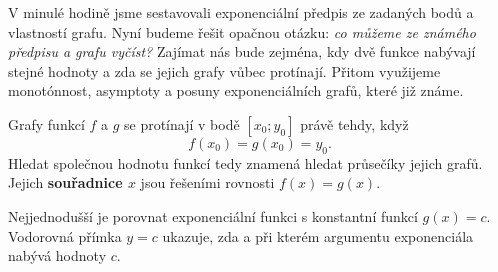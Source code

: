 \documentclass[11pt,a4paper]{article}
\begin{document}
V minulé hodině jsme sestavovali exponenciální předpis ze zadaných bodů a vlastností grafu. Nyní budeme řešit opačnou otázku: \emph{co můžeme ze známého předpisu a grafu vyčíst?} Zajímat nás bude zejména, kdy dvě funkce nabývají stejné hodnoty a zda se jejich grafy vůbec protínají. Přitom využijeme monotónnost, asymptoty a posuny exponenciálních grafů, které již známe.


\begin{zadaniBox}[title={Věta - Průsečíky grafů funkcí}]
Grafy funkcí $f$ a $g$ se protínají v bodě $[x_0;y_0]$ právě tehdy, když
\[
  f(x_0)=g(x_0)=y_0.
\]
Hledat společnou hodnotu funkcí tedy znamená hledat průsečíky jejich grafů. Jejich \textbf{souřadnice $x$} jsou řešeními rovnosti $f(x)=g(x)$.
\end{zadaniBox}

Nejjednodušší je porovnat exponenciální funkci s konstantní funkcí $g(x)=c$. Vodorovná přímka $y=c$ ukazuje, zda a při kterém argumentu exponenciála nabývá hodnoty $c$.
\end{document}
